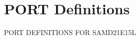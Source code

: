 \hypertarget{group___s_a_m_d21_e15_l__port}{}\section{P\+O\+RT Definitions}
\label{group___s_a_m_d21_e15_l__port}
P\+O\+RT D\+E\+F\+I\+N\+I\+T\+I\+O\+NS F\+OR S\+A\+M\+D21\+E15L 